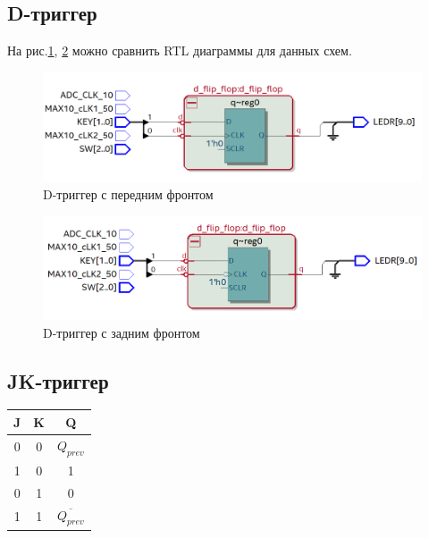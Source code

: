\documentclass[a4paper,14pt]{article}
\begin{document}
\subsection{D-триггер}


На рис.\ref{fig:5_RTL_posedge_sample}, \ref{fig:5_RTL_negedge} можно сравнить RTL диаграммы для данных схем.

\begin{figure}[H]
	\centering
	\includegraphics[width=0.7\linewidth]{imgs/5_RTL_posedge_sample}
	\caption{D-триггер с передним фронтом}
	\label{fig:5_RTL_posedge_sample}
\end{figure}

\begin{figure}[H]
	\centering
	\includegraphics[width=0.7\linewidth]{imgs/5_RTL_negedge}
	\caption{D-триггер с задним фронтом}
	\label{fig:5_RTL_negedge}
\end{figure}


\subsection{JK-триггер}

\begin{table}[H]
	\begin{center}
	\begin{flushleft}
	\end{flushleft}
		\label{tab:jk_flip_flop}
		\begin{tabular}{|c|c|c|}
			\hline
			J & K & Q                     \\ \hline
			0 & 0 & $Q_{prev}$            \\ \hline
			1 & 0 & 1                     \\ \hline
			0 & 1 & 0                     \\ \hline
			1 & 1 & $\overline{Q_{prev}}$ \\ \hline
		\end{tabular}
	\end{center}
\end{table}
\end{document}
